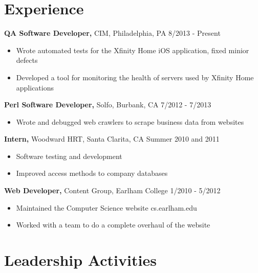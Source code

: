 \documentclass[margin]{res}
\begin{document}
\begin{resume}
\section{Experience}
 {\bf QA Software Developer,} CIM, Philadelphia, PA \hfill 8/2013 - Present
 \begin{itemize} \itemsep -2pt  %
 \item  Wrote automated tests for the Xfinity Home iOS application, fixed minior defects
 \item  Developed a tool for monitoring the health of servers used by Xfinity Home applications
 \end{itemize}
\vspace*{-4mm}
 {\bf Perl Software Developer,} Solfo, Burbank, CA \hfill 7/2012 - 7/2013    
 \begin{itemize} \itemsep -2pt  %
 \item  Wrote and debugged web crawlers to scrape business data from websites
 \end{itemize}
\vspace*{-4mm}
 {\bf Intern,} Woodward HRT, Santa Clarita, CA \hfill Summer  2010 and 2011 
 \begin{itemize} \itemsep -2pt  %
 \item Software testing and development 
 \item Improved access methods to company databases
 \end{itemize}
\vspace*{-4mm}
 {\bf Web Developer,} Content Group, Earlham College \hfill 1/2010 - 5/2012  
 \begin{itemize} \itemsep -2pt  %
 \item Maintained the Computer Science website cs.earlham.edu
 \item Worked with a team to do a complete overhaul of the website
 \end{itemize}

\vspace*{-1mm}
\section{Leadership   Activities} 
  

\end{resume}
\end{document}
